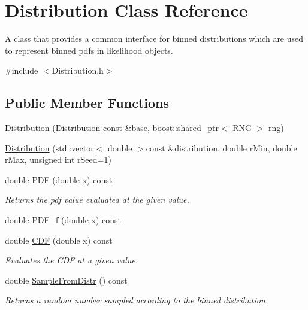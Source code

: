 \hypertarget{classDistribution}{\section{Distribution Class Reference}
\label{classDistribution}
}


A class that provides a common interface for binned distributions which are used to represent binned pdfs in likelihood objects.  




{\ttfamily \#include $<$Distribution.\-h$>$}

\subsection*{Public Member Functions}
\begin{DoxyCompactItemize}
\item 
\hyperlink{classDistribution_a7671d190019f4e6d1014a561a9e3cc65}{Distribution} (\hyperlink{classDistribution}{Distribution} const \&base, boost\-::shared\-\_\-ptr$<$ \hyperlink{classRNG}{R\-N\-G} $>$ rng)
\item 
\hyperlink{classDistribution_aa3e0993c88569f42c2a14124fa06bee6}{Distribution} (std\-::vector$<$ double $>$const \&distribution, double r\-Min, double r\-Max, unsigned int r\-Seed=1)
\item 
double \hyperlink{classDistribution_a26a55e9b524f94fb5c75e3c8abe96ecd}{P\-D\-F} (double x) const 
\begin{DoxyCompactList}\small\item\em Returns the pdf value evaluated at the given value. \end{DoxyCompactList}\item 
double \hyperlink{classDistribution_a94a970330e540c2061d6c05dc9f60f1d}{P\-D\-F\-\_\-f} (double x) const 
\item 
double \hyperlink{classDistribution_ac852b7915ba69e2d8f9cee0e5dab68b5}{C\-D\-F} (double x) const 
\begin{DoxyCompactList}\small\item\em Evaluates the C\-D\-F at a given value. \end{DoxyCompactList}\item 
double \hyperlink{classDistribution_a503ae8b2d80c3c26a8c9a255c59761f2}{Sample\-From\-Distr} () const 
\begin{DoxyCompactList}\small\item\em Returns a random number sampled according to the binned distribution. \end{DoxyCompactList}\item 

\end{DoxyCompactItemize}
